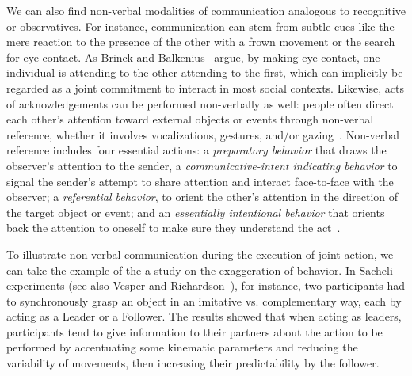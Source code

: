 \documentclass[a4paper,11pt,twoside]{StyleThese}
\begin{document}
We can also find non-verbal modalities of communication analogous to recognitive or observatives. For instance, communication can stem from subtle cues like the mere reaction to the presence of the other with a frown movement or the search for eye contact. As Brinck and Balkenius~\cite{brinck_2018_mutual} argue, by making eye contact, one individual is attending to the other attending to the first, which can implicitly be regarded as a joint commitment to interact in most social contexts. Likewise, acts of acknowledgements can be performed non-verbally as well: people often direct each other's attention toward external objects or events through non-verbal reference, whether it involves vocalizations, gestures, and/or gazing~\cite{bates_1979_emergence, leavens_2004_referential, brinck_2008_role}. Non-verbal reference includes four essential actions: a \emph{preparatory behavior} that draws the observer’s attention to the sender, a \emph{communicative-intent indicating behavior} to signal the sender’s attempt to share attention and interact face-to-face with the observer; a \emph{referential behavior}, to orient the other’s attention in the direction of the target object or event; and an \emph{essentially intentional behavior} that orients back the attention to oneself to make sure they understand the act~\cite[p.~122-123]{brinck_2008_role}.

To illustrate non-verbal communication during the execution of joint action, we can take the example of the a study on the exaggeration of behavior. In Sacheli \etal{} experiments (see also Vesper and Richardson~\cite{vesper_2014_strategic}), for instance, two participants had to synchronously grasp an object in an imitative vs. complementary way, each by acting as a Leader or a Follower. The results showed that when acting as leaders, participants tend to give information to their partners about the action to be performed by accentuating some kinematic parameters and reducing the variability of movements, then increasing their predictability by the follower. 
\end{document}
